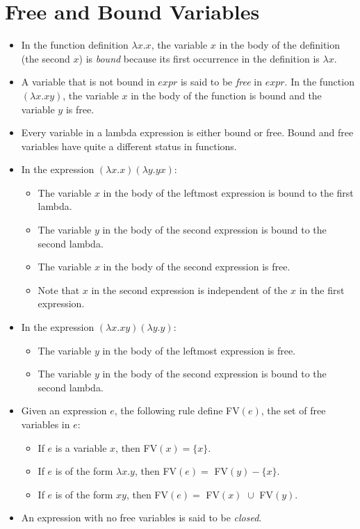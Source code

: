 \documentclass[]{article}
\begin{document}
\section{Free and Bound Variables}
\begin{itemize}
\item In the function definition $\lambda x.x$, the variable $x$ in the body of the definition (the second $x$) is \emph{bound} because its first occurrence in the definition is $\lambda x$.
\item A variable that is not bound in $expr$ is said to be \emph{free} in $expr$. In the function $(\lambda x.xy)$, the variable $x$ in the body of the function is bound and the variable $y$ is free.
\item Every variable in a lambda expression is either bound or free. Bound and free variables have quite a different status in functions.
\item In the expression $(\lambda x.x)(\lambda y.yx)$:
\begin{itemize}
\item The variable $x$ in the body of the leftmost expression is bound to the first lambda.
\item The variable $y$ in the body of the second expression is bound to the second lambda.
\item The variable $x$ in the body of the second expression is free.
\item Note that $x$ in the second expression is independent of the $x$ in the first expression.
\end{itemize}
\item In the expression $(\lambda x.xy)(\lambda y.y)$:
\begin{itemize}
\item The variable $y$ in the body of the leftmost expression is free.
\item The variable $y$ in the body of the second expression is bound to the second lambda.
\end{itemize}
\item Given an expression $e$, the following rule define FV$(e)$, the set of free variables in $e$:
\begin{itemize}
\item If $e$ is a variable $x$, then FV$(x) = \{x\}$.
\item If $e$ is of the form $\lambda x.y$, then FV$(e) =$ FV$(y) - \{x\}$.
\item If $e$ is of the form $xy$, then FV$(e) =$ FV$(x)\,\,\cup$ FV$(y)$.
\end{itemize}
\item An expression with no free variables is said to be \emph{closed}.
\end{itemize}
\end{document}

